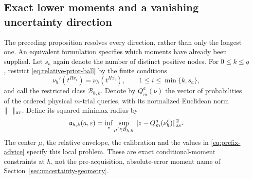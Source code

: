\documentclass[11pt]{amsart}
\theoremstyle{definition}\newtheorem{definition}[theorem]{Definition}
\theoremstyle{remark}\newtheorem{remark}[theorem]{Remark}
\begin{document}
\subsection{Exact lower moments and a vanishing uncertainty direction}
The preceding proposition resolves every direction, rather than only
the longest one. An equivalent formulation specifies which moments have
already been supplied. Let $s_a$ again denote the number of distinct
positive nodes. For $0\le k\le q$, restrict
\eqref{eq:relative-prior-ball} by the finite conditions
\begin{equation}\label{eq:prefix-advice}
 \nu_h'(t^{Hx_i})=\nu_h(t^{Hx_i}),
                 \qquad 1\le i\le\min\{k,s_a\},
\end{equation}
and call the restricted class $\mathcal B_{h,k}$. Denote by
$Q_m^a(\nu)$ the vector of probabilities of the ordered physical
$m$-trial queries, with its normalized Euclidean norm $\|\cdot\|_{\rm av}$.
Define its squared minimax radius by
\[
 \mathfrak a_{h,k}(a,\varepsilon)=
 \inf_z\sup_{\mu'\in\mathcal B_{h,k}}
       \|z-Q_m^a(\nu_h')\|_{\rm av}^2.
\]
The center $\mu$, the relative envelope, the calibration and the values
in \eqref{eq:prefix-advice} specify this local problem. These are exact
conditional-moment constraints at $h$, not the pre-acquisition,
absolute-error moment name of Section~\ref{sec:uncertainty-geometry}.
\end{document}
